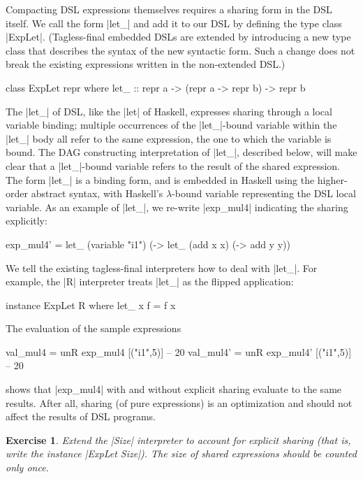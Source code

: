 \documentclass[submission,copyright,creativecommons]{eptcs}
\newtheorem{Exercise}{Exercise} \newcommand\aside[1]{}
\begin{document}
Compacting DSL expressions themselves requires a sharing form in
the DSL itself. We call the form |let_| and add it to our
DSL by defining the type class |ExpLet|.  (Tagless-final embedded
DSLs are extended by introducing a new type class that describes the
syntax of the new syntactic form.  Such a change does not break the
existing expressions written in the non-extended DSL.)
\begin{code}
class ExpLet repr where
  let_ :: repr a -> (repr a -> repr b) -> repr b
\end{code}
The |let_| of DSL, like the |let| of Haskell, expresses sharing
through a local variable binding; multiple occurrences of the
|let_|-bound variable within the |let_| body all refer to the same
expression, the one to which the variable is bound. The DAG
constructing interpretation of |let_|, described below, will make
clear that a |let_|-bound variable refers to the result of the shared
expression. The form |let_| is a binding form, and is embedded in
Haskell using the higher-order abstract syntax, with Haskell's
$\lambda$-bound variable representing the DSL local variable. As an
example of |let_|, we re-write |exp_mul4| indicating the sharing
explicitly:
\begin{code}
exp_mul4' = 
 let_ (variable "i1") (\x ->
 let_ (add x x)       (\y->
 add y y))
\end{code}

We tell the existing tagless-final interpreters how to deal with
|let_|. For example, the |R| interpreter treats |let_| as the flipped
application:
\begin{code}
instance ExpLet R where
  let_ x f = f x
\end{code}
The evaluation of the sample expressions
\begin{code}
val_mul4  = unR exp_mul4  [("i1",5)] -- 20
val_mul4' = unR exp_mul4' [("i1",5)] -- 20
\end{code}
shows that |exp_mul4| with and without explicit sharing evaluate to
the same results. After all, sharing (of pure expressions) is an
optimization and should not affect the results of DSL programs.
\begin{Exercise}
Extend the |Size| interpreter to account for explicit sharing
(that is, write the instance |ExpLet Size|). The size of shared
expressions should be counted only once.
\end{Exercise}
\end{document}
